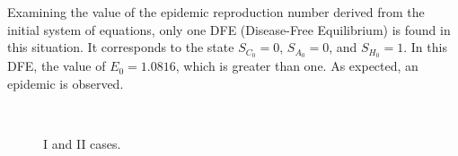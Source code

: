 Examining the value of the epidemic reproduction number derived from the initial system of equations, only one DFE (Disease-Free Equilibrium) is found in this situation. It corresponds to the state $S_{C_0} = 0$, $S_{A_0} = 0$, and $S_{H_0} = 1$. In this DFE, the value of $E_0 = 1.0816$, which is greater than one. As expected, an epidemic is observed.
\begin{figure}[h]
	\centering
	 \quad
	 \\
	\caption[Full model simulation figure first]{I and II cases.}
	\label{fig:sim_B1_B2_less_equal}
\end{figure}

